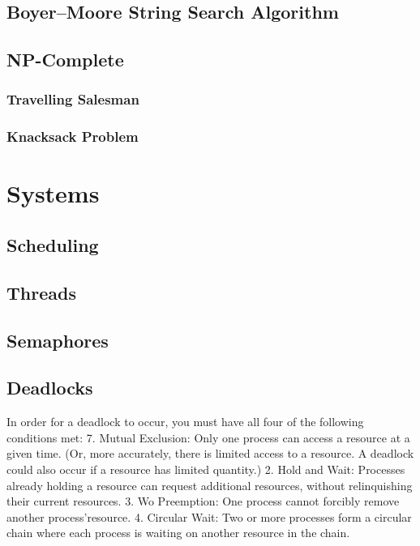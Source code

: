 \documentclass{article}
\begin{document}
	\subsection{Boyer–Moore String Search Algorithm}
	\subsection{NP-Complete}
		\subsubsection{Travelling Salesman}
		\subsubsection{Knacksack Problem}


\clearpage
\section{Systems}
	\subsection{Scheduling}
	\subsection{Threads}
	\subsection{Semaphores}
	\subsection{Deadlocks}
	In order for a deadlock to occur, you must have all four of the following conditions met:
	7. Mutual Exclusion: Only one process can access a resource at a given time. (Or, more
	accurately, there is limited access to a resource. A deadlock could also occur if a
	resource has limited quantity.)
	2. Hold and Wait: Processes already holding a resource can request additional resources,
	without relinquishing their current resources.
	3. Wo Preemption: One process cannot forcibly remove another process'resource.
	4. Circular Wait: Two or more processes form a circular chain where each process is
	waiting on another resource in the chain.
\end{document}
